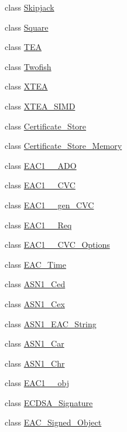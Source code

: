 \begin{DoxyCompactItemize}
\item 
class \hyperlink{classBotan_1_1Skipjack}{Skipjack}
\item 
class \hyperlink{classBotan_1_1Square}{Square}
\item 
class \hyperlink{classBotan_1_1TEA}{T\-E\-A}
\item 
class \hyperlink{classBotan_1_1Twofish}{Twofish}
\item 
class \hyperlink{classBotan_1_1XTEA}{X\-T\-E\-A}
\item 
class \hyperlink{classBotan_1_1XTEA__SIMD}{X\-T\-E\-A\-\_\-\-S\-I\-M\-D}
\item 
class \hyperlink{classBotan_1_1Certificate__Store}{Certificate\-\_\-\-Store}
\item 
class \hyperlink{classBotan_1_1Certificate__Store__Memory}{Certificate\-\_\-\-Store\-\_\-\-Memory}
\item 
class \hyperlink{classBotan_1_1EAC1__1__ADO}{E\-A\-C1\-\_\-\_\-\-A\-D\-O}
\item 
class \hyperlink{classBotan_1_1EAC1__1__CVC}{E\-A\-C1\-\_\-\_\-\-C\-V\-C}
\item 
class \hyperlink{classBotan_1_1EAC1__1__gen__CVC}{E\-A\-C1\-\_\-\_\-gen\-\_\-\-C\-V\-C}
\item 
class \hyperlink{classBotan_1_1EAC1__1__Req}{E\-A\-C1\-\_\-\_\-\-Req}
\item 
class \hyperlink{classBotan_1_1EAC1__1__CVC__Options}{E\-A\-C1\-\_\-\_\-\-C\-V\-C\-\_\-\-Options}
\item 
class \hyperlink{classBotan_1_1EAC__Time}{E\-A\-C\-\_\-\-Time}
\item 
class \hyperlink{classBotan_1_1ASN1__Ced}{A\-S\-N1\-\_\-\-Ced}
\item 
class \hyperlink{classBotan_1_1ASN1__Cex}{A\-S\-N1\-\_\-\-Cex}
\item 
class \hyperlink{classBotan_1_1ASN1__EAC__String}{A\-S\-N1\-\_\-\-E\-A\-C\-\_\-\-String}
\item 
class \hyperlink{classBotan_1_1ASN1__Car}{A\-S\-N1\-\_\-\-Car}
\item 
class \hyperlink{classBotan_1_1ASN1__Chr}{A\-S\-N1\-\_\-\-Chr}
\item 
class \hyperlink{classBotan_1_1EAC1__1__obj}{E\-A\-C1\-\_\-\_\-obj}
\item 
class \hyperlink{classBotan_1_1ECDSA__Signature}{E\-C\-D\-S\-A\-\_\-\-Signature}
\item 
class \hyperlink{classBotan_1_1EAC__Signed__Object}{E\-A\-C\-\_\-\-Signed\-\_\-\-Object}
\item 

\end{DoxyCompactItemize}
